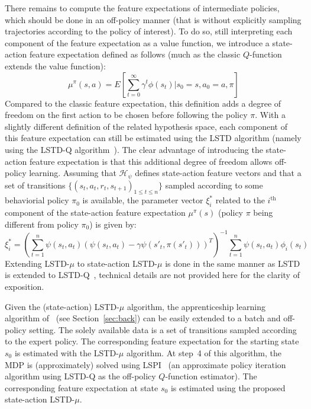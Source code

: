 \documentclass{jfpda2011}
\begin{document}
There remains to compute the feature expectations of intermediate
policies, which should be done in an off-policy manner (that is
without explicitly sampling trajectories according to the policy of
interest). To do so, still interpreting each component of the
feature expectation as a value function, we introduce a state-action
feature expectation defined as follows (much as the classic
$Q$-function extends the value function):
\begin{equation}
  \mu^\pi(s,a) = E[\sum_{t=0}^\infty \gamma^t
  \phi(s_t)|s_0=s,a_0=a,\pi]
\end{equation}
Compared to the classic feature expectation, this definition adds a
degree of freedom on the first action to be chosen before following
the policy $\pi$. With a slightly different definition of the
related hypothesis space, each component of this feature expectation
can still be estimated using the LSTD algorithm (namely using the
LSTD-Q algorithm~\citep{lagoudakis2003least}). The clear advantage of
introducing the state-action feature expectation is that this
additional degree of freedom allows off-policy learning. Assuming
that $\mathcal{H}_\psi$ defines state-action feature vectors and
that a set of transitions $\{(s_t,a_t,r_t,s_{t+1})_{1\leq t \leq
n}\}$ sampled according to some behaviorial policy $\pi_0$ is
available, the parameter vector $\xi_i^*$ related to the
$i^\text{th}$ component of the state-action feature expectation
$\mu^\pi(s)$ (policy $\pi$ being different from policy $\pi_0$) is
given by:
\begin{equation}
  \xi_i^* = \left(\sum_{t=1}^n
  \psi(s_t,a_t)(\psi(s_t,a_t)-\gamma\psi(s'_{t},\pi(s'_t)))^T\right)^{-1}
  \sum_{t=1}^n \psi(s_t,a_t) \phi_i(s_t)
\end{equation}
Extending LSTD-$\mu$ to state-action LSTD-$\mu$ is done in the same
manner as LSTD is extended to LSTD-Q~\citep{lagoudakis2003least},
technical details are not provided here for the clarity of
exposition.

Given the (state-action) LSTD-$\mu$ algorithm, the apprenticeship
learning algorithm of~\citep{abbeel2004apprenticeship} (see
Section~\ref{sec:back}) can be easily extended to a batch and
off-policy setting. The solely available data is a set of
transitions sampled according to the expert policy. The
corresponding feature expectation for the starting state $s_0$ is
estimated with the LSTD-$\mu$ algorithm. At step~4 of this
algorithm, the MDP is (approximately) solved using
LSPI~\citep{lagoudakis2003least} (an approximate policy iteration
algorithm using LSTD-Q as the off-policy $Q$-function estimator).
The corresponding feature expectation at state $s_0$ is estimated
using the proposed state-action LSTD-$\mu$.
\end{document}
